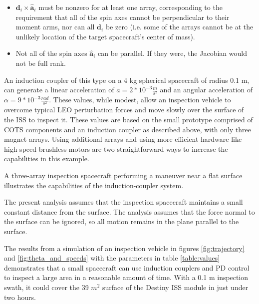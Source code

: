 \begin{itemize}
\item  $\boldsymbol{d}_i{\times}\hat{\boldsymbol{a}}_i$ must be nonzero for at least one array, corresponding to the requirement that all of the spin axes cannot be perpendicular to their moment arms, nor can all $\boldsymbol{d}_i$ be zero (i.e. some of the arrays cannot be at the unlikely location of the target spacecraft's center of mass).
\item  Not all of the spin axes $\hat{\boldsymbol{a}}_i$ can be parallel. If they were, the Jacobian would not be full rank.
\end{itemize}

An induction coupler of this type on a 4 kg spherical spacecraft of radius 0.1 m, can generate a linear acceleration of
$a = 2*10^{-3} \frac{m}{s^2}$ 
and an angular acceleration of 
$\alpha = 9*10^{-3} \frac{rad}{s^2}$. 
These values, while modest, allow an inspection vehicle to overcome typical LEO perturbation forces
\cite{wertz2011space}
 and move slowly over the surface of the ISS to inspect it. These values are based on the small prototype comprised of COTS components and an induction coupler as described above, with only three magnet arrays. Using additional arrays and using more efficient hardware like high-speed brushless motors are two straightforward ways to increase the capabilities in this example.

A three-array inspection spacecraft performing a maneuver near a flat surface illustrates the capabilities of the induction-coupler system. 

The present analysis assumes that the inspection spacecraft maintains a small constant distance from the surface. The analysis assumes that the force normal to the surface can be ignored, so all motion remains in the plane parallel to the surface. 

The results from a simulation of an inspection vehicle in figures \ref{fig:trajectory} and \ref{fig:theta_and_speeds} with the parameters in table \ref{table:values} demonstrates that a small spacecraft can use induction couplers and PD control to inspect a large area in a 
reasonable amount of time. With a 0.1 m inspection swath, it could cover the 39 $m^2$ surface of the Destiny ISS module in just under two hours.   

